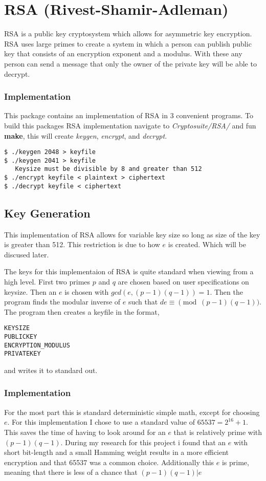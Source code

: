 

\chapter{RSA (Rivest-Shamir-Adleman)}

RSA is a public key cryptosystem which allows for asymmetric key encryption.
RSA uses large primes to create a system in which a person can publish public key
that consists of an encryption exponent and a modulus.
With these any person can send a message that only the owner of the private key will be able to decrypt. 

\subsection{Implementation}
This package contains an implementation of RSA in 3 convenient programs.
To build this packages RSA implementation navigate to \textit{Cryptosuite/RSA/} and fun \textbf{make}, this will create \textit{keygen}, \textit{ encrypt}, and \textit{decrypt}.

\begin{verbatim}
$ ./keygen 2048 > keyfile
$ ./keygen 2041 > keyfile
   Keysize must be divisible by 8 and greater than 512
$ ./encrypt keyfile < plaintext > ciphertext
$ ./decrypt keyfile < ciphertext
\end{verbatim}

\section{ Key Generation}

This implementation of  RSA allows for variable key size so long as size of the key is greater than 512. This restriction is due to how $e$ is created. Which will be discused later.

The keys for this implementaion of RSA is quite standard when viewing from a high level.
First two primes $p$ and $q$ are chosen based on user specifications on keysize. Then an $e$ is chosen with $gcd(e,(p-1)(q-1)) = 1$. 
Then the program finds the modular inverse of $e$ such that $de \equiv \pmod{(p-1)(q-1)} $.
The program then creates a keyfile in the format,
\begin{verbatim}
KEYSIZE
PUBLICKEY
ENCRYPTION_MODULUS
PRIVATEKEY
\end{verbatim}
and writes it to standard out.

\subsection{Implementation}
For the most part this is standard deterministic simple math, except for choosing $e$.
For this implementation I chose to use a standard value of $65537 = 2^{16} +1$.
This saves the time of having to look around for an $e$ that is relatively prime with $(p-1)(q-1)$.
During my research for this project i found that an $e$ with short bit-length and a small Hamming weight results in a more efficient encryption and that 65537 was a common choice. 
Additionally this $e$ is prime, meaning that there is less of a chance that $(p-1)(q-1)|e$

